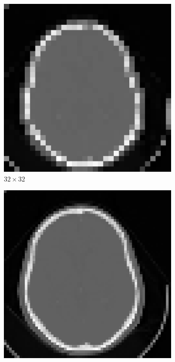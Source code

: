 \documentclass[letterpaper,12pt]{article}
\theoremstyle{plain}
\begin{document}
\begin{figure}[H]
\begin{subfigure}[h]{0.24\textwidth}
        \end{subfigure}
         \begin{subfigure}[h]{0.24\textwidth}
            \centering
            \includegraphics[width=\textwidth]{Figuras/Interpolate_bilinear_f=0.25.png}
            \caption{$32\times32$} 
         \end{subfigure}
         \begin{subfigure}[h]{0.24\textwidth}
            \centering
            \includegraphics[width=\textwidth]{Figuras/Interpolate_bilinear_f=0.5.png}

\end{subfigure}
\end{figure}
\end{document}
